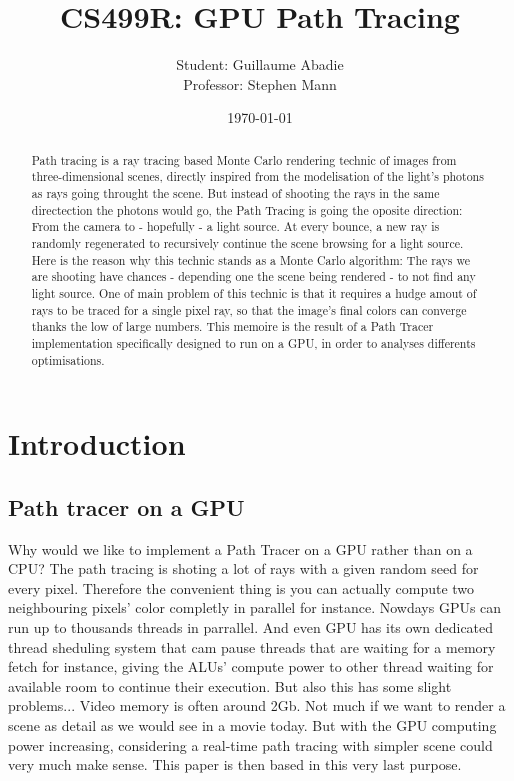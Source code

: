 \documentclass[11pt,twocolumn,a4paper]{article}
\begin{document}
\title{CS499R: GPU Path Tracing}
\author{
    Student: Guillaume Abadie\\
    Professor: Stephen Mann
}
\date{\today}
\maketitle

\begin{abstract}

Path tracing is a ray tracing based Monte Carlo rendering technic of images from
three-dimensional scenes, directly inspired from the modelisation of the light's
photons as rays going throught the scene. But instead of shooting the rays in the
same directection the photons would go, the Path Tracing is going the oposite
direction: From the camera to - hopefully - a light source. At every bounce, a new
ray is randomly regenerated to recursively continue the scene browsing for a
light source. Here is the reason why this technic stands as a Monte Carlo
algorithm: The rays we are shooting have chances - depending one the scene
being rendered - to not find any light source. One of main problem of this
technic is that it requires a hudge
amout of rays to be traced for a single pixel ray, so that the image's final
colors can converge thanks the low of large numbers. This memoire is the result
of a Path Tracer implementation
specifically designed to run on a GPU, in order to analyses differents
optimisations.

\end{abstract}

\section{Introduction}
\subsection{Path tracer on a GPU}
Why would we like to implement a Path Tracer on a GPU rather than on a CPU?
The path tracing is shoting a lot of rays with a given random seed
for every pixel. Therefore the convenient thing is you can actually
compute two neighbouring pixels' color completly in parallel for instance.
Nowdays GPUs can run up to thousands threads in parrallel. And even GPU has
its own dedicated thread sheduling system that cam pause threads that are
waiting for a memory fetch for instance, giving the ALUs' compute power to
other thread waiting for available room to continue their execution. But also
this has some slight problems... Video memory is often around 2Gb. Not much if
we want to render a scene as detail as we would see in a movie today. But with
the GPU computing power increasing, considering a real-time path tracing with
simpler scene could very much make sense. This paper is then based in this
very last purpose.
\end{document}
